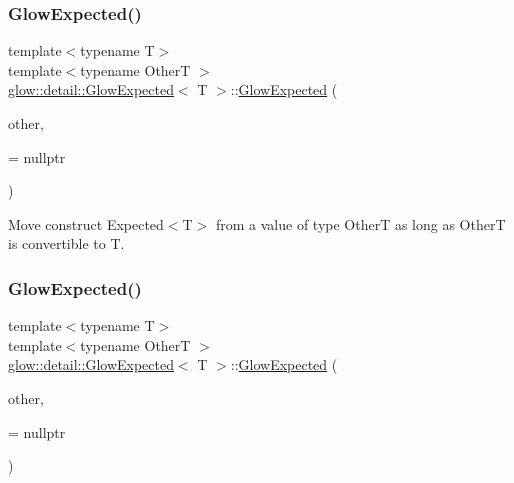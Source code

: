 \subsubsection{\texorpdfstring{Glow\+Expected()}{GlowExpected()}\hspace{0.1cm}{\footnotesize\ttfamily [2/3]}}
{\footnotesize\ttfamily template$<$typename T$>$ \\
template$<$typename OtherT $>$ \\
\hyperlink{classglow_1_1detail_1_1_glow_expected}{glow\+::detail\+::\+Glow\+Expected}$<$ T $>$\+::\hyperlink{classglow_1_1detail_1_1_glow_expected}{Glow\+Expected} (\begin{DoxyParamCaption}\item[{OtherT \&\&}]{other,  }\item[{typename std\+::enable\+\_\+if$<$ std\+::is\+\_\+convertible$<$ OtherT, T $>$\+::value $>$\+::type $\ast$}]{ = {\ttfamily nullptr} }\end{DoxyParamCaption})\hspace{0.3cm}{\ttfamily [inline]}}

Move construct Expected$<$\+T$>$ from a value of type OtherT as long as OtherT is convertible to T. \mbox{\label{classglow_1_1detail_1_1_glow_expected_adefb9b97647f3b44c5442bf5d9295630}} 
\subsubsection{\texorpdfstring{Glow\+Expected()}{GlowExpected()}\hspace{0.1cm}{\footnotesize\ttfamily [3/3]}}
{\footnotesize\ttfamily template$<$typename T$>$ \\
template$<$typename OtherT $>$ \\
\hyperlink{classglow_1_1detail_1_1_glow_expected}{glow\+::detail\+::\+Glow\+Expected}$<$ T $>$\+::\hyperlink{classglow_1_1detail_1_1_glow_expected}{Glow\+Expected} (\begin{DoxyParamCaption}\item[{\hyperlink{classglow_1_1detail_1_1_glow_expected}{Glow\+Expected}$<$ OtherT $>$ \&\&}]{other,  }\item[{typename std\+::enable\+\_\+if$<$ std\+::is\+\_\+convertible$<$ OtherT, T $>$\+::value $>$\+::type $\ast$}]{ = {\ttfamily nullptr} }\end{DoxyParamCaption})\hspace{0.3cm}{\ttfamily [inline]}}


